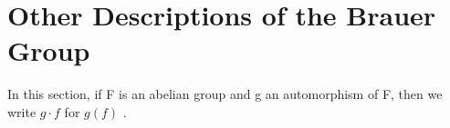 \section{Other Descriptions of the Brauer Group}

In this section, if F is an abelian group and g an automorphism of F, then we write \(g \cdot f\) for \(g(f)\) .

